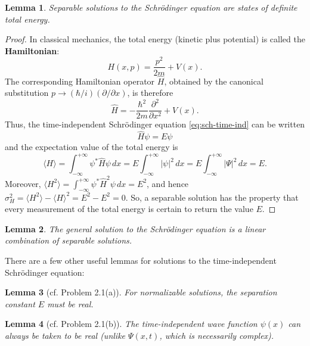 \documentclass{article}
\newtheorem{lemma}{Lemma}
\begin{document}
\begin{lemma}
  Separable solutions to the Schr\"{o}dinger equation are states of
  \emph{definite total energy}.
\end{lemma}
\begin{proof}
  In classical mechanics, the total energy (kinetic plus potential) is called
  the \textbf{Hamiltonian}: \[
    H(x, p) = \frac{p^2}{2m} + V(x).
  \] The corresponding Hamiltonian operator $\hat{H}$, obtained by the
  canonical substitution $p \rightarrow (\hbar/i)(\partial/\partial x)$, is
  therefore
  \begin{equation} \label{eq:ham-op}
    \hat{H} = -\frac{\hbar^2}{2m} \frac{\partial^2}{\partial x^2} + V(x).
  \end{equation}
  Thus, the time-independent Schr\"{o}dinger equation \eqref{eq:sch-time-ind}
  can be written
  \begin{equation} \label{eq:sch-time-ind-ham}
    \hat{H}\psi = E\psi
  \end{equation}
  and the expectation value of the total energy is \[
    \langle H \rangle
    = \int_{-\infty}^{+\infty} \psi^* \hat{H} \psi \,dx
    = E\int_{-\infty}^{+\infty} |\psi|^2 \,dx
    = E\int_{-\infty}^{+\infty} |\Psi|^2 \,dx
    = E.
    \] Moreover, $\langle H^2 \rangle = \int_{-\infty}^{+\infty} \psi^* 
    \hat{H}^2 \psi \,dx = E^2$, and hence $\sigma_H^2 = \langle H^2 \rangle -
    \langle H \rangle^2 = E^2 - E^2 = 0$. So, a separable solution has the
    property that every measurement of the total energy is certain to return
    the value $E$.
\end{proof}

\begin{lemma}
  The general solution to the Schr\"{o}dinger equation is a \emph{linear
  combination} of separable solutions.
\end{lemma}

There are a few other useful lemmas for solutions to the time-independent
Schr\"{o}dinger equation:

\begin{lemma}[cf. Problem 2.1(a)]
  For normalizable solutions, the separation constant $E$ must be real.
\end{lemma}

\begin{lemma}[cf. Problem 2.1(b)]
  The time-independent wave function $\psi(x)$ can always be taken to be real
  (unlike $\Psi(x, t)$, which is necessarily complex).
\end{lemma}
\end{document}
